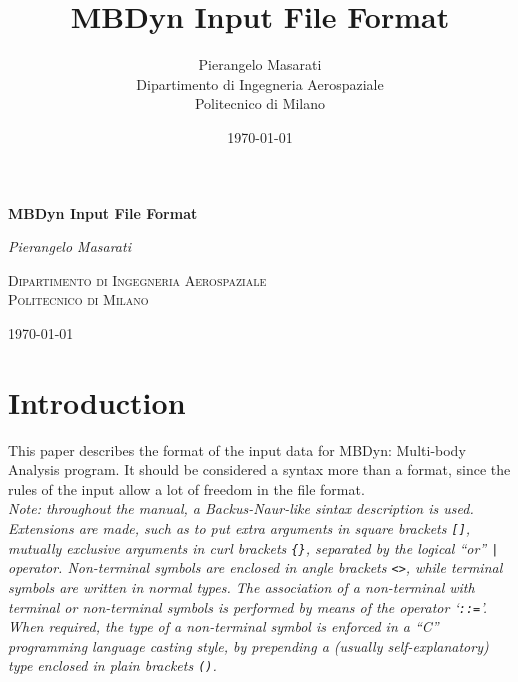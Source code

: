 \documentclass[10pt,dvips]{report}
\begin{document}
\begin{latexonly}
\title{\bf MBDyn Input File Format}
\author{Pierangelo Masarati \vspace{5mm}\\
    \sc Dipartimento di Ingegneria Aerospaziale \\
    \sc Politecnico di Milano}
\date{\today}
\maketitle
\end{latexonly}

\begin{htmlonly}
\begin{center}
\textbf{\LARGE MBDyn Input File Format}

\emph{\large Pierangelo Masarati}

\textsc{Dipartimento di Ingegneria Aerospaziale \\ Politecnico di Milano}

\today
\end{center}
\end{htmlonly}




\tableofcontents
\newpage

\chapter{Introduction}
This paper describes the format of the input data for MBDyn: 
Multi-body Analysis program.
It should be considered a syntax more than a format, since the rules of the
input allow a lot of freedom in the file format. \\
{\em
    Note: throughout the manual, a Backus-Naur-like sintax description is
    used. 
    Extensions are made, such as to put extra arguments in square brackets
    \texttt{[]}, mutually exclusive arguments in curl brackets \texttt{\{\}},
    separated by the logical ``or'' \texttt{|} operator.
    Non-terminal symbols are enclosed in angle brackets \texttt{<>}, while
    terminal symbols are written in normal types.
    The association of a non-terminal with terminal or non-terminal
    symbols is performed by means of the operator `\texttt{::=}'. 
    When required, the type of a non-terminal symbol is enforced in a ``C''
    programming language casting style, by prepending a (usually
    self-explanatory) type enclosed in plain brackets \texttt{()}.
}




\end{document}
